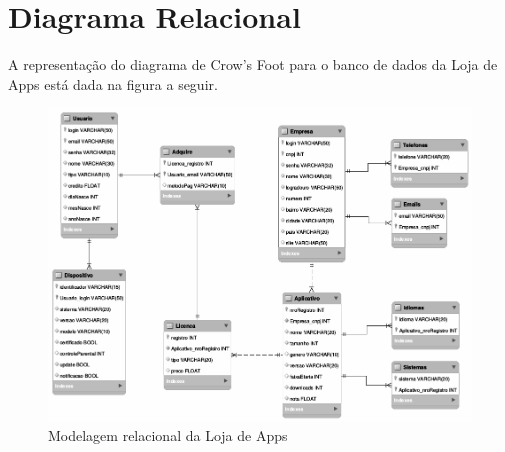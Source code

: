 \section{Diagrama Relacional}

\vspace{5mm}

A representação do diagrama de Crow's Foot para o banco de dados da Loja de Apps está dada na figura a seguir.

\vspace{5mm}

\begin{figure}[!htb]
\centering
\includegraphics[width=18cm]{galinha}
\caption{Modelagem relacional da Loja de Apps}
\label{Rotulo}
\end{figure}